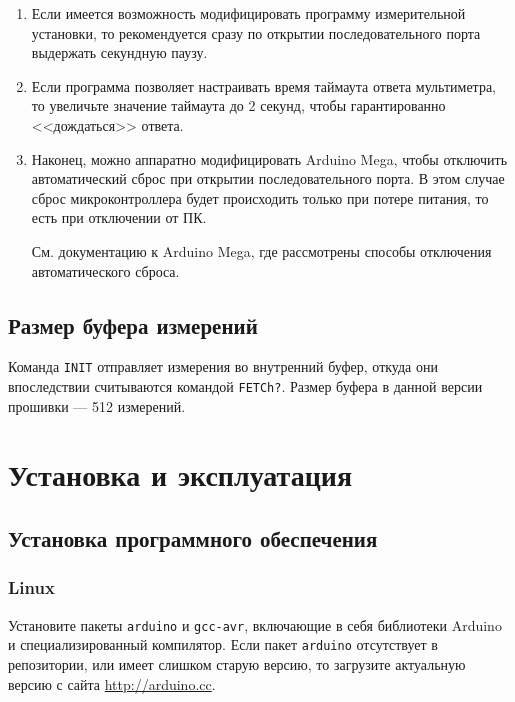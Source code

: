 \documentclass[12pt, a4paper]{article}
\newcommand{\Arduino}{Arduino Mega}
\newcommand{\CMD}[1]{{\tt #1}}
\begin{document}
\begin{enumerate}

\item Если имеется возможность модифицировать программу измерительной установки, то рекомендуется сразу по открытии последовательного порта выдержать секундную паузу.

\item Если программа позволяет настраивать время таймаута ответа мультиметра, то увеличьте значение таймаута до 2 секунд, чтобы гарантированно <<дождаться>> ответа.

\item Наконец, можно аппаратно модифицировать {\Arduino}, чтобы отключить автоматический сброс при открытии последовательного порта. В этом случае сброс микроконтроллера будет происходить только при потере питания, то есть при отключении от ПК.

См. документацию к {\Arduino}, где рассмотрены способы отключения автоматического сброса.

\end{enumerate}

\subsection{Размер буфера измерений}
\label{sec_in_buffer}

Команда \CMD{INIT} отправляет измерения во внутренний буфер, откуда они впоследствии считываются командой \CMD{FETCh?}. Размер буфера в данной версии прошивки --- 512 измерений.

\section{Установка и эксплуатация}

\subsection{Установка программного обеспечения}

\subsubsection{Linux}

Установите пакеты {\tt arduino} и {\tt gcc-avr}, включающие в себя библиотеки Arduino и специализированный компилятор. Если пакет {\tt arduino} отсутствует в репозитории, или имеет слишком старую версию, то загрузите актуальную версию с сайта \url{http://arduino.cc}.
\end{document}
